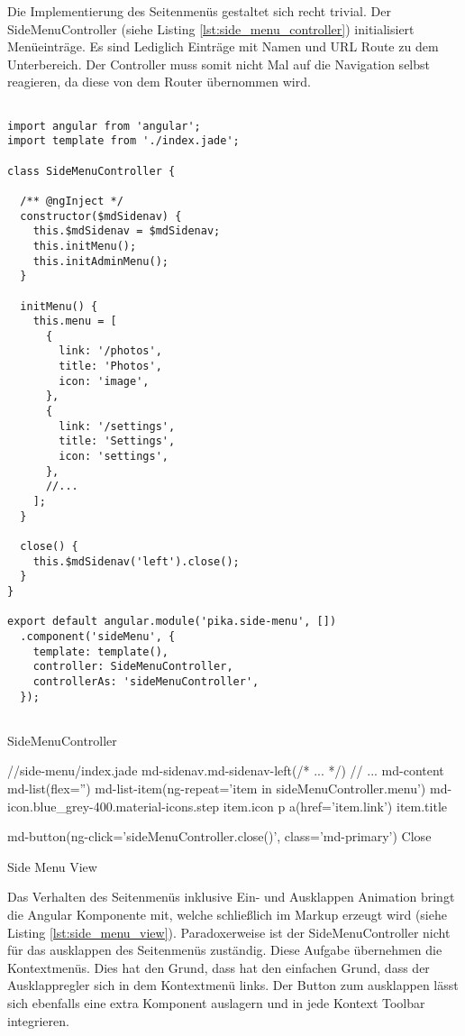 Die Implementierung des Seitenmenüs gestaltet sich recht trivial. Der SideMenuController (siehe Listing \ref{lst:side_menu_controller}) initialisiert Menüeinträge. Es sind Lediglich Einträge mit Namen und URL Route zu dem Unterbereich. Der Controller muss somit nicht Mal auf die Navigation selbst reagieren, da diese von dem Router übernommen wird.


\begin{listing}[H]
\begin{verbatim}

import angular from 'angular';
import template from './index.jade';

class SideMenuController {

  /** @ngInject */
  constructor($mdSidenav) {
    this.$mdSidenav = $mdSidenav;
    this.initMenu();
    this.initAdminMenu();
  }

  initMenu() {
    this.menu = [
      {
        link: '/photos',
        title: 'Photos',
        icon: 'image',
      },
      {
        link: '/settings',
        title: 'Settings',
        icon: 'settings',
      },
      //...
    ];
  }

  close() {
    this.$mdSidenav('left').close();
  }
}

export default angular.module('pika.side-menu', [])
  .component('sideMenu', {
    template: template(),
    controller: SideMenuController,
    controllerAs: 'sideMenuController',
  });


\end{verbatim}
\caption{SideMenuController}
\label{lst:side_menu_controller}
\end{listing} 


\begin{listing}[H]

//side-menu/index.jade
md-sidenav.md-sidenav-left(/* ... */)
  // ...
  md-content
    md-list(flex='')
      md-list-item(ng-repeat='item in sideMenuController.menu')
        md-icon.blue_grey-400.material-icons.step {{item.icon}}
        p a(href='item.link')
            {{item.title}}
     
    md-button(ng-click='sideMenuController.close()', class='md-primary') Close

\caption{Side Menu View}
\label{lst:side_menu_view}
\end{listing} 

Das Verhalten des Seitenmenüs inklusive Ein- und Ausklappen Animation bringt die Angular  Komponente mit, welche schließlich im Markup erzeugt wird (siehe Listing \ref{lst:side_menu_view}). Paradoxerweise ist der SideMenuController nicht für das ausklappen des Seitenmenüs zuständig. Diese Aufgabe übernehmen die Kontextmenüs. Dies hat den Grund, dass hat den einfachen Grund, dass der Ausklappregler sich in dem Kontextmenü links. Der Button zum ausklappen lässt sich ebenfalls eine extra Komponent auslagern und in jede Kontext Toolbar integrieren. 

